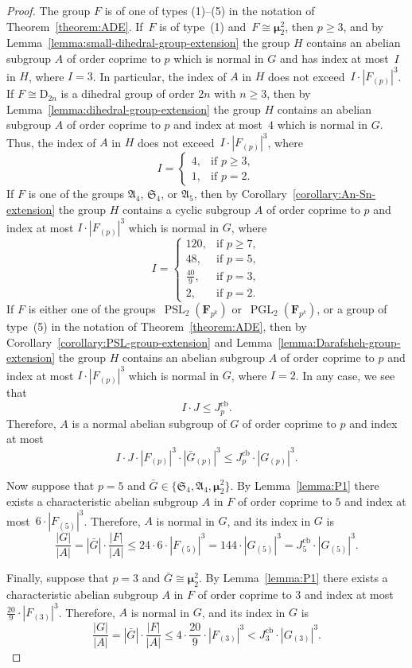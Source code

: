 \documentclass[12pt]{amsart}
\numberwithin{equation}{section}
\theoremstyle{definition}
\newcommand{\mumu}{\boldsymbol{\mu}}
\newcommand{\DD}{\mathrm D}
\DeclareMathOperator{\PGL}{PGL}
\DeclareMathOperator{\PSL}{PSL}
\def \ge {\geqslant}
\def \le {\leqslant}
\begin{document}
\begin{proof}
The group $F$ is of one of
types (1)--(5) in the notation of Theorem~\ref{theorem:ADE}.
If~$F$ is of type~(1)
and~\mbox{$F\cong\mumu_2^2$}, then $p\ge 3$, and
by Lemma~\ref{lemma:small-dihedral-group-extension} the group $H$ contains an abelian subgroup $A$ of order coprime to $p$ which is normal in $G$ and has index at most~$I$ in $H$, where $I=3$. In particular, the index of $A$ in $H$ does
not exceed~\mbox{$I\cdot |F_{(p)}|^3$}.
If $F\cong\DD_{2n}$ is a dihedral group of order $2n$ with $n\ge 3$,
then by Lemma~\ref{lemma:dihedral-group-extension} the group $H$ contains an abelian subgroup $A$ of order coprime to $p$ and index at most~$4$ which is normal in $G$.
Thus, the index of $A$ in $H$ does not exceed~\mbox{$I\cdot |F_{(p)}|^3$}, where
$$
I=\begin{cases}
4, &\text{if\ } p\ge 3,\\
1, &\text{if\ } p=2.
\end{cases}
$$
If $F$ is one of the groups
$\mathfrak{A}_4$, $\mathfrak{S}_4$, or $\mathfrak{A}_5$, then
by Corollary~\ref{corollary:An-Sn-extension} the group $H$ contains a cyclic subgroup $A$ of order coprime to $p$ and index at most $I\cdot |F_{(p)}|^3$ which is normal in $G$,
where
$$
I=\begin{cases}
120, &\text{if\ } p\ge 7,\\
48, &\text{if\ } p=5,\\
\frac{40}{9}, &\text{if\ } p=3,\\
2, &\text{if\ } p=2.
\end{cases}
$$
If $F$ is either one of the groups~\mbox{$\PSL_2(\mathbf{F}_{p^k})$}
or~\mbox{$\PGL_2(\mathbf{F}_{p^k})$}, or a group of type~(5) in the notation of
Theorem~\ref{theorem:ADE}, then by Corollary~\ref{corollary:PSL-group-extension}
and Lemma~\ref{lemma:Darafsheh-group-extension} the group $H$ contains an abelian subgroup $A$ of order coprime to $p$ and index at most $I\cdot |F_{(p)}|^3$ which is normal in $G$,
where $I=2$. In any case,
we see that
$$
I\cdot J\le J_p^{\mathrm{cb}}.
$$
Therefore, $A$ is a normal abelian subgroup of $G$ of order coprime to $p$ and
index at most
$$
I\cdot J\cdot |F_{(p)}|^3\cdot |\bar{G}_{(p)}|^3\le J_p^{\mathrm{cb}}\cdot |G_{(p)}|^3.
$$

Now suppose that $p=5$ and $\bar{G}\in\{\mathfrak{S}_4,\mathfrak{A}_4,\mumu_2^2\}$.
By Lemma~\ref{lemma:P1} there exists a characteristic abelian
subgroup $A$ in $F$ of order coprime to $5$
and index at most~\mbox{$6\cdot |F_{(5)}|^3$}. Therefore, $A$ is normal in
$G$, and its index in $G$ is
$$
\frac{|G|}{|A|}=
|\bar{G}|\cdot \frac{|F|}{|A|}\le
24\cdot 6\cdot |F_{(5)}|^3=
144\cdot  |G_{(5)}|^3=
J_5^{\mathrm{cb}}\cdot |G_{(5)}|^3.
$$

Finally,
suppose that $p=3$ and $\bar{G}\cong\mumu_2^2$.
By Lemma~\ref{lemma:P1} there exists a characteristic abelian
subgroup $A$ in $F$ of order coprime to $3$
and index at most~\mbox{$\frac{20}{9}\cdot |F_{(3)}|^3$}. Therefore, $A$ is normal in
$G$, and its index in $G$ is
$$
\frac{|G|}{|A|}=
|\bar{G}|\cdot \frac{|F|}{|A|}\le
4\cdot \frac{20}{9}\cdot |F_{(3)}|^3<J_3^{\mathrm{cb}}\cdot |G_{(3)}|^3.
$$
\end{proof}
\end{document}
